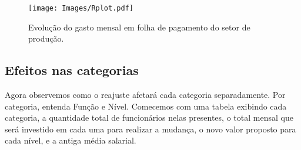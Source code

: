 \documentclass[a4paper, 12pt]{CSSullivanBusinessReport}
\begin{document}
\begin{fullwidth}
\begin{figure}[H] %
	\texttt{[image: Images/Rplot.pdf]}
	\caption{Evolução do gasto mensal em folha de pagamento do setor de produção.}
	\label{fig:reajustetotalmes} 
 \end{figure}

\newpage


\subsection{Efeitos nas categorias} 
Agora observemos como o reajuste afetará cada categoria separadamente. Por categoria, entenda Função e Nível. Comecemos com uma tabela exibindo cada categoria, a quantidade total de funcionários nelas presentes, o total mensal que será investido em cada uma para realizar a mudança, o novo valor proposto para cada nível, e a antiga média salarial. 



\end{fullwidth}
\end{document}
